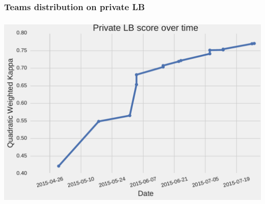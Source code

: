 \begin{frame}\frametitle{Teams distribution on private LB} 
\vspace{-20pt}
\begin{center}
\end{center}
\end{frame}


\begin{frame}\frametitle{} 
\begin{center}
\includegraphics[width=\textwidth]{pics/private_lb_score_increase.pdf}
\end{center}
\end{frame}

